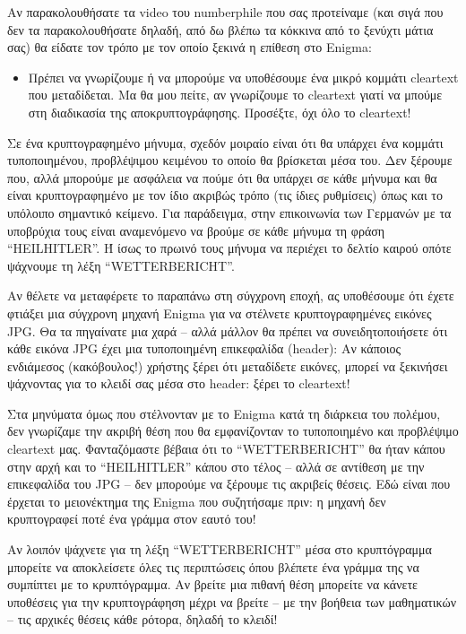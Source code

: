 \documentclass[a4paper,twoside,12pt]{article}
\begin{document}
Αν παρακολουθήσατε τα video του numberphile που σας προτείναμε (και σιγά που δεν τα παρακολουθήσατε δηλαδή, από δω βλέπω τα κόκκινα από το ξενύχτι  μάτια σας) θα είδατε τον τρόπο με τον οποίο ξεκινά η επίθεση στο Enigma:

\begin{itemize}
\item Πρέπει να γνωρίζουμε ή να μπορούμε να υποθέσουμε ένα μικρό κομμάτι cleartext που μεταδίδεται. Μα θα μου πείτε, αν γνωρίζουμε το cleartext γιατί να μπούμε στη διαδικασία της αποκρυπτογράφησης. Προσέξτε, όχι όλο το cleartext!
\end{itemize}

Σε ένα κρυπτογραφημένο μήνυμα, σχεδόν μοιραίο είναι ότι θα υπάρχει ένα κομμάτι τυποποιημένου, προβλέψιμου κειμένου το οποίο θα βρίσκεται μέσα του. Δεν ξέρουμε που, αλλά μπορούμε με ασφάλεια να πούμε ότι θα υπάρχει σε κάθε μήνυμα και θα είναι κρυπτογραφημένο με τον ίδιο ακριβώς τρόπο (τις ίδιες ρυθμίσεις) όπως και το υπόλοιπο σημαντικό κείμενο. Για παράδειγμα, στην επικοινωνία των Γερμανών με τα υποβρύχια τους είναι αναμενόμενο να βρούμε σε κάθε μήνυμα τη φράση “HEILHITLER”. Ή ίσως το πρωινό τους μήνυμα να περιέχει το δελτίο καιρού οπότε ψάχνουμε τη λέξη “WETTERBERICHT”.

Αν θέλετε να μεταφέρετε το παραπάνω στη σύγχρονη εποχή, ας υποθέσουμε ότι έχετε φτιάξει μια σύγχρονη μηχανή Enigma για να στέλνετε κρυπτογραφημένες εικόνες JPG. Θα τα πηγαίνατε μια χαρά – αλλά μάλλον θα πρέπει να συνειδητοποιήσετε ότι κάθε εικόνα JPG έχει μια τυποποιημένη επικεφαλίδα (header): Αν κάποιος ενδιάμεσος (κακόβουλος!) χρήστης ξέρει ότι μεταδίδετε εικόνες, μπορεί να ξεκινήσει ψάχνοντας για το κλειδί σας μέσα στο header: ξέρει το cleartext!

Στα μηνύματα όμως που στέλνονταν με το Enigma κατά τη διάρκεια του πολέμου, δεν γνωρίζαμε την ακριβή θέση που θα εμφανίζονταν το τυποποιημένο και προβλέψιμο cleartext μας. Φανταζόμαστε βέβαια ότι το “WETTERBERICHT” θα ήταν κάπου στην αρχή και το “HEILHITLER” κάπου στο τέλος – αλλά σε αντίθεση με την επικεφαλίδα του JPG – δεν μπορούμε να ξέρουμε τις ακριβείς θέσεις. Εδώ είναι που έρχεται το μειονέκτημα της Enigma που συζητήσαμε πριν: η μηχανή δεν κρυπτογραφεί ποτέ ένα γράμμα στον εαυτό του!

Αν λοιπόν ψάχνετε για τη λέξη “WETTERBERICHT” μέσα στο κρυπτόγραμμα μπορείτε να αποκλείσετε όλες τις περιπτώσεις όπου βλέπετε ένα γράμμα της να συμπίπτει με το κρυπτόγραμμα. Αν βρείτε μια πιθανή θέση μπορείτε να κάνετε υποθέσεις για την κρυπτογράφηση μέχρι να βρείτε – με την βοήθεια των μαθηματικών – τις αρχικές θέσεις κάθε ρότορα, δηλαδή το κλειδί!
\end{document}
